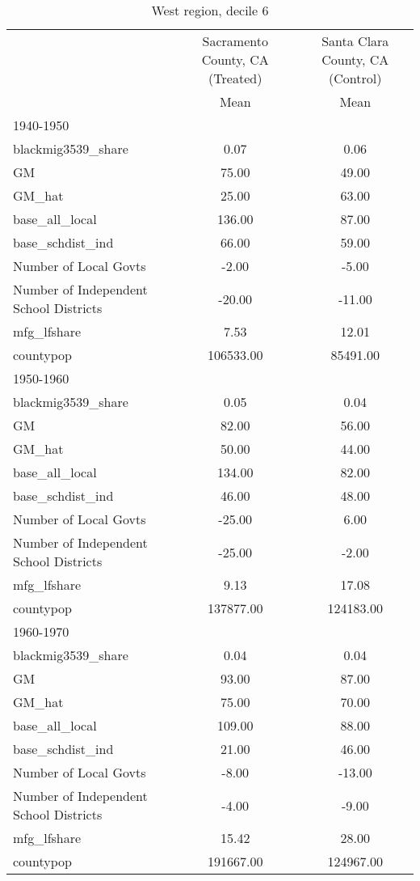 \begin{table}[htbp]\centering
\def\sym#1{\ifmmode^{#1}\else\(^{#1}\)\fi}
\caption{West region, decile 6 \label{tab1}}
\begin{tabular}{l*{2}{c}}
\toprule
                    &\multicolumn{1}{c}{Sacramento County, CA (Treated)}&\multicolumn{1}{c}{Santa Clara County, CA (Control)}\\
                    &        Mean&        Mean\\
\midrule
1940-1950           &            &            \\
blackmig3539\_share  &        0.07&        0.06\\
GM                  &       75.00&       49.00\\
GM\_hat              &       25.00&       63.00\\
base\_all\_local      &      136.00&       87.00\\
base\_schdist\_ind    &       66.00&       59.00\\
Number of Local Govts&       -2.00&       -5.00\\
Number of Independent School Districts&      -20.00&      -11.00\\
mfg\_lfshare         &        7.53&       12.01\\
countypop           &   106533.00&    85491.00\\
\midrule
1950-1960           &            &            \\
blackmig3539\_share  &        0.05&        0.04\\
GM                  &       82.00&       56.00\\
GM\_hat              &       50.00&       44.00\\
base\_all\_local      &      134.00&       82.00\\
base\_schdist\_ind    &       46.00&       48.00\\
Number of Local Govts&      -25.00&        6.00\\
Number of Independent School Districts&      -25.00&       -2.00\\
mfg\_lfshare         &        9.13&       17.08\\
countypop           &   137877.00&   124183.00\\
\midrule
1960-1970           &            &            \\
blackmig3539\_share  &        0.04&        0.04\\
GM                  &       93.00&       87.00\\
GM\_hat              &       75.00&       70.00\\
base\_all\_local      &      109.00&       88.00\\
base\_schdist\_ind    &       21.00&       46.00\\
Number of Local Govts&       -8.00&      -13.00\\
Number of Independent School Districts&       -4.00&       -9.00\\
mfg\_lfshare         &       15.42&       28.00\\
countypop           &   191667.00&   124967.00\\
\bottomrule
\end{tabular}
\end{table}
